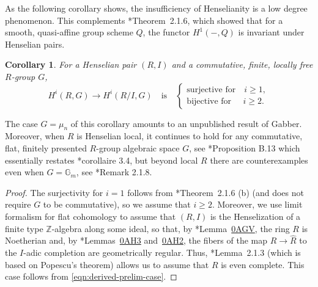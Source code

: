 \documentclass[11pt, reqno]{amsart}
\newcommand{\bG}{\mathbb{G}}
\newcommand{\bZ}{\mathbb{Z}}
\newcommand{\ra}{\rightarrow}
\newcommand{\wh}{\widehat}
\newcommand{\lab}{\label}
\providecommand{\qxq}[1]{\quad\text{#1}\quad}
\providecommand{\xq}[1]{\text{#1}\quad}
\newcommand{\tst}{\textstyle}
\newcommand{\bpf}{\begin{proof}}
\newcommand{\epf}{\end{proof}}
\newcommand{\bcor}{\begin{cor}}
\newcommand{\ecor}{\end{cor}}
\numberwithin{equation}{numberingbase}
\theoremstyle{thms}
\newtheorem{cor}[numberingbase]{Corollary}
\theoremstyle{claims}
\theoremstyle{defs}
\theoremstyle{thms}
\theoremstyle{defs}
\theoremstyle{subsection-tweak}
\theoremstyle{subsection-tweak}
\begin{document}
As the following corollary shows, the insufficiency of Henselianity is a low degree phenomenon.
This complements \cite{BC19}*{Theorem~2.1.6}, which showed that for a smooth, quasi-affine group scheme $Q$, the functor $H^1(-, Q)$ is invariant under Henselian pairs. 

\bcor \lab{inv-Hens-pair}
For a Henselian pair $(R, I)$ and a commutative, finite, locally free $R$-group $G$,
\[
H^i(R, G) \ra H^i(R/I, G) \qxq{is} \begin{cases}\xq{surjective for} i \ge 1, \\ \xq{bijective for}\ \, i \ge 2.  \end{cases}
\]
\ecor

The case $G = \mu_n$ of this corollary amounts to an unpublished result of Gabber. Moreover, when $R$ is Henselian local, it continues to hold for any commutative, flat, finitely presented $R$-group algebraic space $G$, see \cite{topology-torsors}*{Proposition B.13} which essentially restates \cite{Toe11}*{corollaire 3.4}, but beyond local $R$ there are counterexamples even when $G = \bG_m$, see \cite{BC19}*{Remark 2.1.8}. 

\bpf
The surjectivity for $i = 1$ follows from \cite{BC19}*{Theorem~2.1.6 (b)} (and does not require $G$ to be commutative), so we assume that $i \ge 2$. Moreover, we use limit formalism for flat cohomology to assume that $(R, I)$ is the Henselization of a finite type $\bZ$-algebra along some ideal, so that, by \cite{SP}*{Lemma~\href{https://stacks.math.columbia.edu/tag/0AGV}{0AGV}}, the ring $R$ is Noetherian and, by \cite{SP}*{Lemmas~\href{https://stacks.math.columbia.edu/tag/0AH3}{0AH3} and~\href{https://stacks.math.columbia.edu/tag/0AH2}{0AH2}}, the fibers of the map $R \ra \wh{R}$ to the $I$-adic completion are geometrically regular. Thus, \cite{BC19}*{Lemma~2.1.3} (which is based on Popescu's theorem) allows us to assume that $R$ is even complete. This case follows from \eqref{eqn:derived-prelim-case}.
\epf
\end{document}
